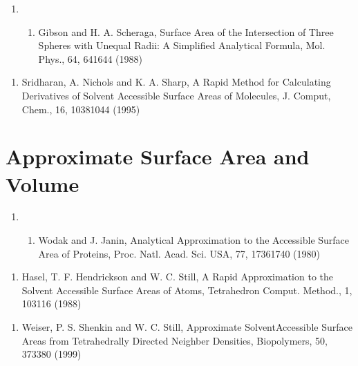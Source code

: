 \documentclass[letterpaper,11pt,english]{sphinxmanual}
\begin{document}
\begin{enumerate}
%
\setcounter{enumi}{10}
\item {} \begin{enumerate}
%
\setcounter{enumii}{3}
\item {} 
Gibson and H. A. Scheraga, Surface Area of the Intersection of Three Spheres with Unequal Radii: A Simplified Analytical Formula, Mol. Phys., 64, 641\sphinxhyphen{}644 (1988)

\end{enumerate}

\end{enumerate}
\begin{enumerate}
%
\setcounter{enumi}{18}
\item {} 
Sridharan, A. Nichols and K. A. Sharp, A Rapid Method for Calculating Derivatives of Solvent Accessible Surface Areas of Molecules, J. Comput, Chem., 16, 1038\sphinxhyphen{}1044 (1995)

\end{enumerate}


\section{Approximate Surface Area and Volume}
\label{\detokenize{text/references:approximate-surface-area-and-volume}}\begin{enumerate}
%
\setcounter{enumi}{18}
\item {} \begin{enumerate}
%
\setcounter{enumii}{9}
\item {} 
Wodak and J. Janin, Analytical Approximation to the Accessible Surface Area of Proteins, Proc. Natl. Acad. Sci. USA, 77, 1736\sphinxhyphen{}1740 (1980)

\end{enumerate}

\end{enumerate}
\begin{enumerate}
%
\setcounter{enumi}{22}
\item {} 
Hasel, T. F. Hendrickson and W. C. Still, A Rapid Approximation to the Solvent Accessible Surface Areas of Atoms, Tetrahedron Comput. Method., 1, 103\sphinxhyphen{}116 (1988)

\end{enumerate}
\begin{enumerate}
%
\setcounter{enumi}{9}
\item {} 
Weiser, P. S. Shenkin and W. C. Still, Approximate Solvent\sphinxhyphen{}Accessible Surface Areas from Tetrahedrally Directed Neighber Densities, Biopolymers, 50, 373\sphinxhyphen{}380 (1999)

\end{enumerate}
\end{document}
